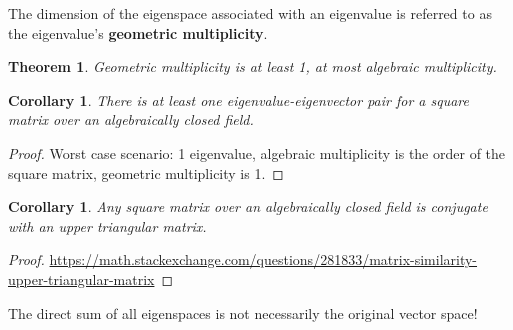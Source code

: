 \documentclass[12pt, letterpaper]{article}
\newcommand{\red}[1]{{\color{red} #1}}
\newtheorem{cor}[prop]{Corollary}
\newtheorem{thm}[prop]{Theorem}
\theoremstyle{definition}
\theoremstyle{remark}
\theoremstyle{definition}
\theoremstyle{plain}
\begin{document}
	\begin{def*}
		The dimension of the eigenspace associated with an eigenvalue is referred to as the eigenvalue's \textbf{geometric multiplicity}.
	\end{def*}
	\begin{thm}
		Geometric multiplicity is at least 1, at most algebraic multiplicity.
	\end{thm}
	\begin{cor}
		There is at least one eigenvalue-eigenvector pair for a square matrix over an algebraically closed field.
	\end{cor}
	\begin{proof}
		Worst case scenario: 1 eigenvalue, algebraic multiplicity is the order of the square matrix, geometric multiplicity is 1.
	\end{proof}
	\begin{cor}
		Any square matrix over an algebraically closed field is conjugate with an upper triangular matrix.
	\end{cor}
	\begin{proof}
		\url{https://math.stackexchange.com/questions/281833/matrix-similarity-upper-triangular-matrix}
	\end{proof}
	\red{The direct sum of all eigenspaces is not necessarily the original vector space!}
	
\end{document}
